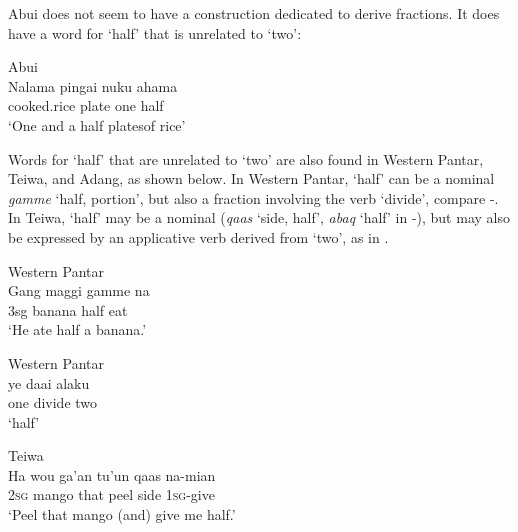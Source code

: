      

 

Abui does not seem to have a construction dedicated to derive fractions. It does have a word for `half' that is unrelated to `two':  


\ea
\label{ex:8:1249}
{\upshape Abui}\\
 \gll   Nalama  pingai  nuku  ahama   \\
    cooked.rice  plate  one  half   \\
 \glt  `One and a half platesof rice'  
\z

 
Words for `half' that are unrelated to `two' are also found in Western Pantar,  Teiwa, and Adang, as shown below.  In Western Pantar, `half' can be a nominal \textit{gamme} `half, portion', but also a fraction involving the verb `divide', compare -. In Teiwa, `half' may be a nominal (\textit{qaas} `side, half', \textit{abaq} `half' in -), but may also be expressed by an applicative verb derived from `two', as in .


\ea%
\label{bkm:Ref342746707}
{\upshape Western Pantar}\\
\gll   Gang  maggi  gamme  na  \\  
      3sg  banana  half  eat  \\
\glt  `He ate half a banana.'
\z








\ea%
\label{bkm:Ref342746708}
{\upshape Western Pantar}\\
\gll  ye  daai  alaku   \\  
    one  divide  two    \\
\glt  `half' 
\z








\ea%
\label{bkm:Ref342746924}
{\upshape Teiwa}\\
\gll  Ha  wou  ga'an  tu'un  qaas  na-mian \\  
     \textsc{2sg} mango  that  peel  side  \textsc{1sg}{}-give \\
\glt  `Peel that mango (and) give me half.'
\z








